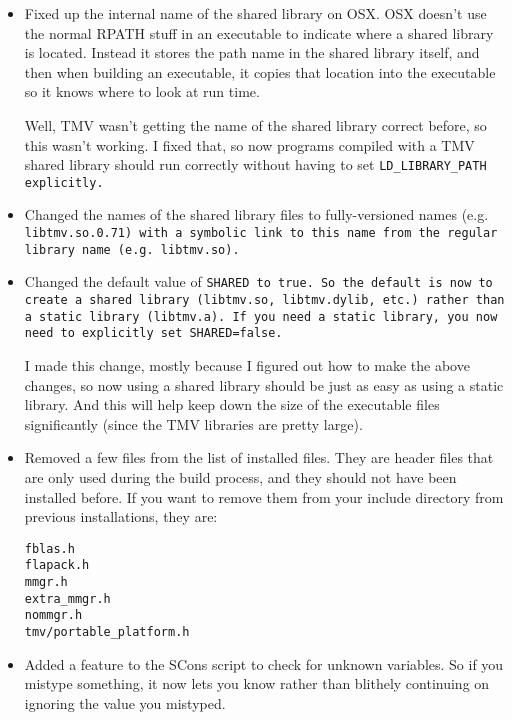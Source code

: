 \begin{itemize}
\item
Fixed up the internal name of the shared library on OSX.  OSX doesn't use the normal
RPATH stuff in an executable to indicate where a shared library is located.
Instead it stores the path name in the shared library itself, and then
when building an executable, it copies that location into the executable
so it knows where to look at run time.

Well, TMV wasn't getting the name of the shared library correct before,
so this wasn't working.  I fixed that, so now programs compiled with a 
TMV shared library should run correctly without having to set
\tt{LD\_LIBRARY\_PATH} explicitly.

\item
Changed the names of the shared library files to fully-versioned names
(e.g. \tt{libtmv.so.0.71}) with a symbolic link to this name from the 
regular library name (e.g. \tt{libtmv.so}).

\item
Changed the default value of \tt{SHARED} to true.  So the default is now
to create a shared library (\tt{libtmv.so}, \tt{libtmv.dylib}, etc.) rather than a 
static library (\tt{libtmv.a}).  If you need a static library, you now need
to explicitly set \tt{SHARED=false}.

I made this change, mostly because I figured out how to make the above changes, so now using a shared library should be just as easy as using a static library.  And this will help keep down the size of the executable files significantly (since the TMV libraries are pretty large).

\item
Removed a few files from the list of installed files.  They are header 
files that are only used during the build process, and they should not have 
been installed before.  If you want to remove them from your include directory
from previous installations, they are:

\tt{fblas.h}\\
\tt{flapack.h}\\
\tt{mmgr.h}\\
\tt{extra\_mmgr.h}\\
\tt{nommgr.h}\\
\tt{tmv/portable\_platform.h}

\item
Added a feature to the SCons script to check for unknown variables.
So if you mistype something, it now lets you know rather than blithely 
continuing on ignoring the value you mistyped.

\end{itemize}
